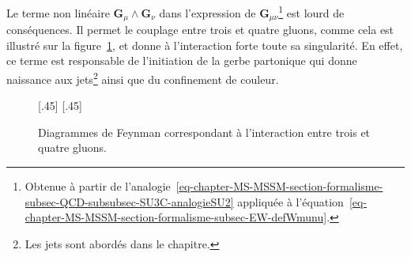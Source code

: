 \par Le terme non linéaire $\bm{G}_\mu\wedge\bm{G}_\nu$ dans l'expression de $\bm{G}_{\mu\nu}$\footnote{Obtenue à partir de l'analogie~\eqref{eq-chapter-MS-MSSM-section-formalisme-subsec-QCD-subsubsec-SU3C-analogieSU2} appliquée à l'équation~\eqref{eq-chapter-MS-MSSM-section-formalisme-subsec-EW-defWmunu}.} est lourd de conséquences.
Il permet le couplage entre trois et quatre gluons, comme cela est illustré sur la figure~\ref{fig-fgraph-QCD_3_et_4_gluons}, et donne à l'interaction forte toute sa singularité. En effet, ce terme est responsable de l'initiation de la gerbe partonique qui donne naissance aux jets\footnote{Les jets sont abordés dans le chapitre.} ainsi que du confinement de couleur.
\begin{figure}[h]
\centering
\vspace{\baselineskip}
\subcaptionbox{\label{subfig-fgraph-ggg}}[.45\textwidth]
{\vspace{\baselineskip}}
\hfill
\subcaptionbox{\label{subfig-fgraph-gggg}}[.45\textwidth]
{\vspace{\baselineskip}}

\caption{Diagrammes de Feynman correspondant à l'interaction entre trois et quatre gluons.}
\label{fig-fgraph-QCD_3_et_4_gluons}
\end{figure}
